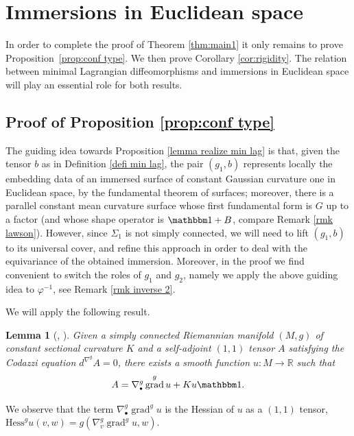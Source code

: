 \documentclass[JEP,XML,SOM,Unicode,NoEqCountersInSection,published]{cedram}
\newcommand{\sbullet}{{\scriptscriptstyle\bullet}}
\newtheorem{lemma}[cor]{Lemma}
\theoremstyle{definition}
\newcommand{\R}{{\mathbb R}}
\DeclareMathOperator{\grad}{grad}
\begin{document}
\section{Immersions in Euclidean space}\label{sec:surfaces}

In order to complete the proof of Theorem \ref{thm:main1} it only remains to prove Proposition~\ref{prop:conf type}. We then prove Corollary \ref{cor:rigidity}. The relation between minimal Lagrangian diffeomorphisms and immersions in Euclidean space will play an essential role for both results.

\subsection{Proof of Proposition \ref{prop:conf type}}

The guiding idea towards Proposition \ref{lemma realize min lag} is that, given the tensor $b$ as in Definition \ref{defi min lag}, the pair $(g_1,b)$ represents locally the embedding data of an immersed surface of constant Gaussian curvature one in Euclidean space, by the fundamental theorem of surfaces; moreover, there is a parallel constant mean curvature surface whose first fundamental form is $G$ up to a factor (and whose shape operator is $\mathbbm 1+B$, compare Remark \ref{rmk lawson}). However, since $\Sigma_1$ is not simply connected, we will need to lift $(g_1,b)$ to its universal cover, and refine this approach in order to deal with the equivariance of the obtained immersion. Moreover, in the proof we find convenient to switch the roles of $g_1$ and $g_2$, namely we apply the above guiding idea to $\varphi^{-1}$, see Remark \ref{rmk inverse 2}.

We will apply the following result.

\begin{lemma}[{\cite{zbMATH03682587}, \cite[Prop.\,1.3.3]{zbMATH03791189}}] \label{lemma codazzi}
Given a simply connected Riemannian manifold $(M,g)$ of constant sectional curvature $K$ and a self-adjoint $(1,1)$ tensor $A$ satisfying the Codazzi equation $d^{\nabla^g}\!A=0$, there exists a smooth function $u:M\to\R$ such that
\[
A=\nabla^g_\sbullet\grad^gu+Ku\mathbbm 1.
\]
\end{lemma}

We observe that the term $\nabla^g_\sbullet\grad^gu$ is the Hessian of $u$ as a $(1,1)$ tensor, \ie $\mathrm{Hess}^g u(v,w)=g(\nabla^g_v\grad^gu,w)$.
\end{document}
